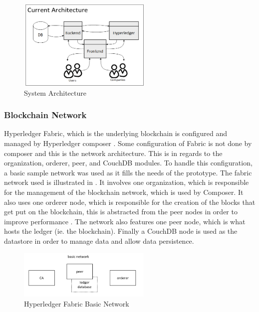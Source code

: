 \documentclass[11pt,journal]{IEEEtran}
\begin{document}
\begin{figure}
  \centering
  \includegraphics[width=2.5in]{current_arch}
  \caption{System Architecture}
  \label{fig:CurrentArch}
\end{figure}

\subsubsection{Blockchain Network}

Hyperledger Fabric, which is the underlying blockchain is configured and managed by Hyperledger composer \cite{WhyHyper54:online}\cite{Composer:online}. Some configuration of Fabric is not done by composer and this is the network architecture. This is in regards to the organization, orderer, peer, and CouchDB modules. To handle this configuration, a basic sample network was used as it fills the needs of the prototype. The fabric network used is illustrated in \cite[Fig. \ref{fig:FabricNetwork}]{WhyHyper54:online}. It involves one organization, which is responsible for the management of the blockchain network, which is used by Composer. It also uses one orderer node, which is responsible for the creation of the blocks that get put on the blockchain, this is abstracted from the peer nodes in order to improve performance \cite{Composer:online}. The network also features one peer node, which is what hosts the ledger (ie. the blockchain). Finally a CouchDB node is used as the datastore in order to manage data and allow data persistence.

\begin{figure}
  \centering
  \includegraphics[width=2.5in]{fabric_network}
  \caption{Hyperledger Fabric Basic Network}
  \label{fig:FabricNetwork}
\end{figure}
\end{document}
